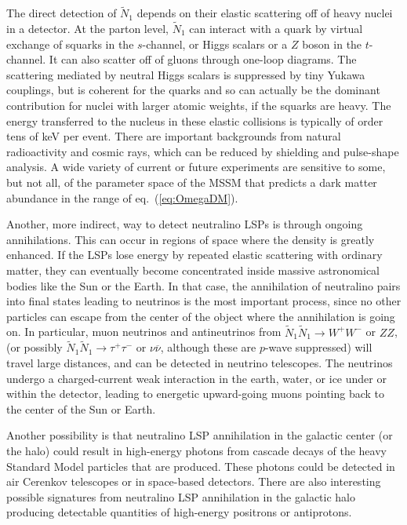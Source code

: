 \documentclass[12pt]{article}
\def\stilde{\widetilde}
\def\NI{\stilde N_1}
\begin{document}
The direct detection of $\NI$ depends on their elastic scattering off of 
heavy nuclei in a detector. At the parton level, $\NI$ can interact with a 
quark by virtual exchange of squarks in the $s$-channel, or Higgs scalars 
or a $Z$ boson in the $t$-channel. It can also scatter off of gluons 
through one-loop diagrams. The scattering mediated by neutral Higgs 
scalars is suppressed by tiny Yukawa couplings, but is coherent for the 
quarks and so can actually be the dominant contribution for nuclei with 
larger atomic weights, if the squarks are heavy. The energy transferred to 
the nucleus in these elastic collisions is typically of order tens of keV 
per event. There are important backgrounds from natural radioactivity and 
cosmic rays, which can be reduced by shielding and pulse-shape analysis. A 
wide variety of current or future experiments are sensitive to some, but 
not all, of the parameter space of the MSSM that predicts a dark matter 
abundance in the range of eq.~(\ref{eq:OmegaDM}).

Another, more indirect, way to detect neutralino LSPs is through ongoing 
annihilations. This can occur in regions of space where the density is 
greatly enhanced. If the LSPs lose energy by repeated elastic scattering 
with ordinary matter, they can eventually become concentrated inside 
massive astronomical bodies like the Sun or the Earth. In that case, the 
annihilation of neutralino pairs into final states leading to neutrinos is 
the most important process, since no other particles can escape from the 
center of the object where the annihilation is going on. In particular, 
muon neutrinos and antineutrinos from $\NI\NI \rightarrow W^+ W^-$ or 
$ZZ$, (or possibly $\NI\NI \rightarrow \tau^+ \tau^-$ or 
$\nu\overline\nu$, although these are $p$-wave suppressed) will travel 
large distances, and can be detected in neutrino telescopes. The neutrinos 
undergo a charged-current weak interaction in the earth, water, or ice 
under or within the detector, leading to energetic upward-going muons 
pointing back to the center of the Sun or Earth.

Another possibility is that neutralino LSP annihilation in the galactic 
center (or the halo) could result in high-energy photons from cascade 
decays of the heavy Standard Model particles that are produced.  These 
photons could be detected in air Cerenkov telescopes or in space-based 
detectors. There are also interesting possible signatures from neutralino 
LSP annihilation in the galactic halo producing detectable quantities of 
high-energy positrons or antiprotons.
\end{document}
